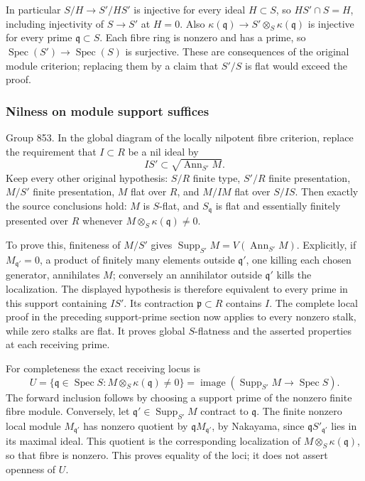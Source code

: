 In particular \(S/H\to S'/HS'\) is injective for every ideal \(H\subset S\), so \(HS'\cap S=H\), including injectivity of \(S\to S'\) at \(H=0\). Also \(\kappa(\mathfrak q)\to S'\otimes_S\kappa(\mathfrak q)\) is injective for every prime \(\mathfrak q\subset S\). Each fibre ring is nonzero and has a prime, so \(\operatorname{Spec}(S')\to\operatorname{Spec}(S)\) is surjective. These are consequences of the original module criterion; replacing them by a claim that \(S'/S\) is flat would exceed the proof.

\subsubsection{Nilness on module support suffices}\label{algebra-proof-038-nilness-on-module-support-suffices}

Group 853. In the global diagram of the locally nilpotent fibre criterion, replace the requirement that \(I\subset R\) be a nil ideal by \[
IS'\subset\sqrt{\operatorname{Ann}_{S'}M}.
\] Keep every other original hypothesis: \(S/R\) finite type, \(S'/R\) finite presentation, \(M/S'\) finite presentation, \(M\) flat over \(R\), and \(M/IM\) flat over \(S/IS\). Then exactly the source conclusions hold: \(M\) is \(S\)-flat, and \(S_{\mathfrak q}\) is flat and essentially finitely presented over \(R\) whenever \(M\otimes_S\kappa(\mathfrak q)\ne0\).

To prove this, finiteness of \(M/S'\) gives \(\operatorname{Supp}_{S'}M=V(\operatorname{Ann}_{S'}M)\). Explicitly, if \(M_{\mathfrak q'}=0\), a product of finitely many elements outside \(\mathfrak q'\), one killing each chosen generator, annihilates \(M\); conversely an annihilator outside \(\mathfrak q'\) kills the localization. The displayed hypothesis is therefore equivalent to every prime in this support containing \(IS'\). Its contraction \(\mathfrak p\subset R\) contains \(I\). The complete local proof in the preceding support-prime section now applies to every nonzero stalk, while zero stalks are flat. It proves global \(S\)-flatness and the asserted properties at each receiving prime.

For completeness the exact receiving locus is \[
U=\{\mathfrak q\in\operatorname{Spec}S:
M\otimes_S\kappa(\mathfrak q)\ne0\}
=\operatorname{image}(\operatorname{Supp}_{S'}M\longrightarrow\operatorname{Spec}S).
\] The forward inclusion follows by choosing a support prime of the nonzero finite fibre module. Conversely, let \(\mathfrak q'\in\operatorname{Supp}_{S'}M\) contract to \(\mathfrak q\). The finite nonzero local module \(M_{\mathfrak q'}\) has nonzero quotient by \(\mathfrak qM_{\mathfrak q'}\), by Nakayama, since \(\mathfrak qS'_{\mathfrak q'}\) lies in its maximal ideal. This quotient is the corresponding localization of \(M\otimes_S\kappa(\mathfrak q)\), so that fibre is nonzero. This proves equality of the loci; it does not assert openness of \(U\).

